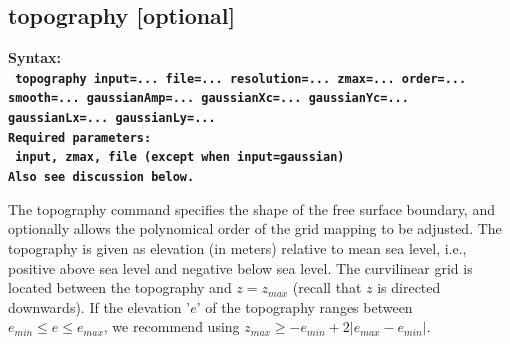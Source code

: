 \documentclass[11pt]{report}
\begin{document}
{\subsection{topography [optional]}
\label{keyword:topo}
\begin{flushleft}
	\bf
	Syntax:\\
	\tt
	topography input=... file=... resolution=... zmax=... order=... smooth=... gaussianAmp=... gaussianXc=... gaussianYc=... gaussianLx=... gaussianLy=...\\
	\bf
	Required parameters:\\
	\tt
	input, zmax, file (except when input=gaussian)\\
	\rm Also see discussion below.
\end{flushleft}
The topography command specifies the shape of the free surface boundary, and optionally allows the
polynomical order of the grid mapping to be adjusted. The topography is given as elevation (in
meters) relative to mean sea level, i.e., positive above sea level and negative below sea level. The
curvilinear grid is located between the topography and $z=z_{max}$ (recall that $z$ is directed
downwards). If the elevation '$e$' of the topography ranges between $e_{min}\leq e \leq e_{max}$, we
recommend using $z_{max} \geq -e_{min} + 2|e_{max} - e_{min}|$.

}
\end{document}
